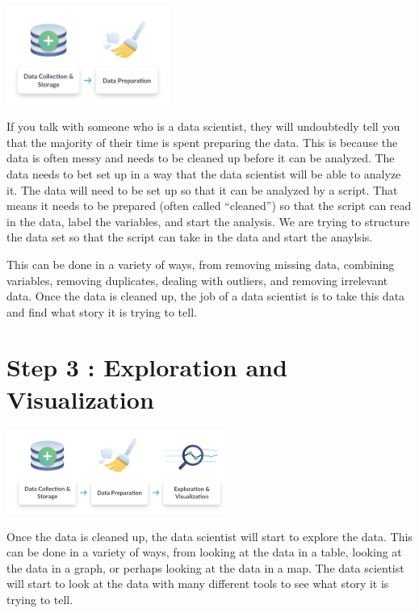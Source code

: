 \documentclass[
  letterpaper,
  DIV=11,
  numbers=noendperiod]{scrreprt}
\begin{document}

\includegraphics[width=0.4\textwidth,height=\textheight]{./images/WIDS-4.jpg}

If you talk with someone who is a data scientist, they will undoubtedly
tell you that the majority of their time is spent preparing the data.
This is because the data is often messy and needs to be cleaned up
before it can be analyzed. The data needs to bet set up in a way that
the data scientist will be able to analyze it. The data will need to be
set up so that it can be analyzed by a script. That means it needs to be
prepared (often called ``cleaned'') so that the script can read in the
data, label the variables, and start the analysis. We are trying to
structure the data set so that the script can take in the data and start
the anaylsis.

This can be done in a variety of ways, from removing missing data,
combining variables, removing duplicates, dealing with outliers, and
removing irrelevant data. Once the data is cleaned up, the job of a data
scientist is to take this data and find what story it is trying to tell.

\section*{Step 3 : Exploration and
Visualization}\label{step-3-exploration-and-visualization}


\includegraphics[width=0.55\textwidth,height=\textheight]{./images/WIDS-5.jpg}

Once the data is cleaned up, the data scientist will start to explore
the data. This can be done in a variety of ways, from looking at the
data in a table, looking at the data in a graph, or perhaps looking at
the data in a map. The data scientist will start to look at the data
with many different tools to see what story it is trying to tell.
\end{document}
